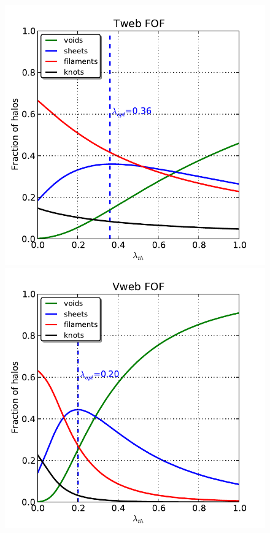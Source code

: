 \documentclass[a4,useAMS,usenatbib,usegraphicx]{latex/mn2e}
\begin{document}
\begin{flushleft}
\begin{figure}
\centering

  \includegraphics[trim = 0mm 0mm 5mm 5mm, clip, keepaspectratio=true,
  width=0.25\textheight]{./figures/halos_fraction_FOF_Tweb.pdf}
  
  \includegraphics[trim = 0mm 0mm 5mm 5mm, clip, keepaspectratio=true,
  width=0.25\textheight]{./figures/halos_fraction_FOF_Vweb.pdf}


\end{figure}
\end{flushleft}
\end{document}
